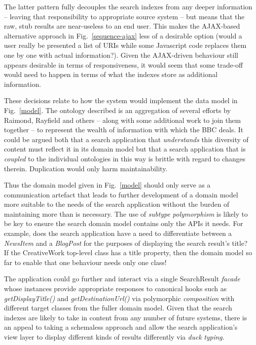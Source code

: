 \documentclass{llncs}
\begin{document}
The latter pattern fully decouples the search indexes from any
deeper information -- leaving that responsibility to appropriate
source system -- but means that the raw, stub results are near-useless
to an end user. This makes the AJAX-based alternative approach
in Fig.~\ref{sequence-ajax}
less of a desirable option (would a user really be presented a list
of URIs while some Javascript code replaces them one by one with
actual information?). Given the AJAX-driven behaviour still appears
desirable in terms of responsiveness, it would seem that some trade-off
would need to happen in terms of what the indexes store as additional
information.

These decisions relate to how the system would implement the data model
in Fig.~\ref{model}. The ontology described is an aggregation
of several efforts by Raimond\cite{raimond2009bbc}, Rayfield
\cite{rayfield2011bbc} and others -- along with some additional work
to join them together -- to represent the wealth of
information with which the BBC deals. It could be argued both that
a search application that \emph{understands} this diversity of
content must reflect it in its domain model but that a search
application that is \emph{coupled} to the individual ontologies
in this way is brittle with regard to changes therein. Duplication
would only harm maintainability.

Thus the domain model given in Fig.~\ref{model} should only serve
as a communication artefact that leads to further development of
a domain model more suitable to the needs of the search application
without the burden of maintaining more than is necessary. The use
of \emph{subtype polymorphism}\cite{booch2007object} is likely
to be key to ensure the search domain model contains only the APIs
it needs. For example, does the search application have a need
to differentiate between a \emph{NewsItem} and a \emph{BlogPost}
for the purposes of displaying the search result's title? If the
CreativeWork top-level class has a title property, then the domain
model so far to enable that one behaviour needs only one class!

The application could go further and interact via a single
SearchResult \emph{facade}\cite{fowler2002patterns} whose
instances provide appropriate responses to canonical hooks
such as \emph{getDisplayTitle()} and \emph{getDestinationUrl()}
via polymorphic \emph{composition} with different target classes
from the fuller domain model. Given that the search indexes
are likely to take in content from any number of future systems,
there is an appeal to taking a schemaless approach\cite{sadalage2012nosql}
and allow the search application's view layer to display
different kinds of results differently via \emph{duck typing}.
\cite{python2013ducktyping}
\end{document}
